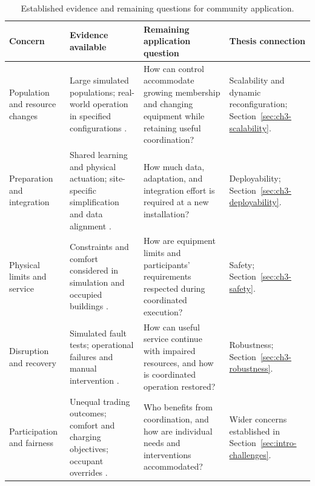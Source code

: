 \begin{table}[!htbp]
\centering
\caption{Established evidence and remaining questions for community application.}
\label{tab:ch3-gap-synthesis}
\begingroup
{}
\fontsize{9.5}{11.3}\selectfont
\setlength{\tabcolsep}{3.5pt}
\renewcommand{\arraystretch}{1.00}
\begin{tabular}{@{}>{\raggedright\arraybackslash}p{}>{\raggedright\arraybackslash}p{}>{\raggedright\arraybackslash}p{}>{\raggedright\arraybackslash}p{}@{}}
\toprule
Concern & Evidence available & Remaining application question & Thesis connection\\
\midrule
Population and resource changes & Large simulated populations; real-world operation in specified configurations \parencite{savino2025attention,mai2024demandresponse,recP01}. & How can control accommodate growing membership and changing equipment while retaining useful coordination? & Scalability and dynamic reconfiguration; Section~\ref{sec:ch3-scalability}.\\
\addlinespace[2pt]
Preparation and integration & Shared learning and physical actuation; site-specific simplification and data alignment \parencite{recP02,hosseini2026cirlem}. & How much data, adaptation, and integration effort is required at a new installation? & Deployability; Section~\ref{sec:ch3-deployability}.\\
\addlinespace[2pt]
Physical limits and service & Constraints and comfort considered in simulation and occupied buildings \parencite{wilk2024smartcommunity,recC13,wang2026buildingmarl}. & How are equipment limits and participants' requirements respected during coordinated execution? & Safety; Section~\ref{sec:ch3-safety}.\\
\addlinespace[2pt]
Disruption and recovery & Simulated fault tests; operational failures and manual intervention \parencite{recC16,recC24,wang2026buildingmarl}. & How can useful service continue with impaired resources, and how is coordinated operation restored? & Robustness; Section~\ref{sec:ch3-robustness}.\\
\addlinespace[2pt]
Participation and fairness & Unequal trading outcomes; comfort and charging objectives; occupant overrides \parencite{recS02,wilk2024smartcommunity,hosseini2026cirlem}. & Who benefits from coordination, and how are individual needs and interventions accommodated? & Wider concerns established in Section~\ref{sec:intro-challenges}.\\

\end{tabular}
\end{table}
